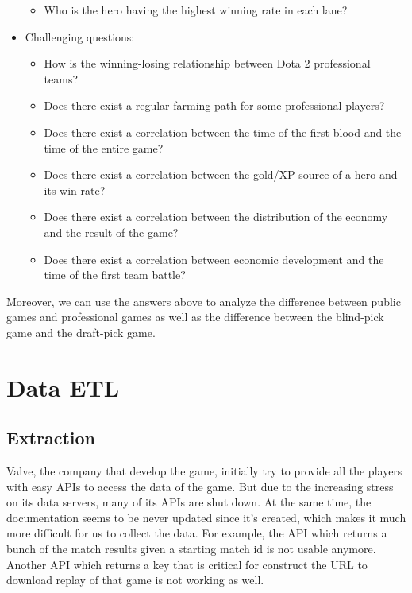 \documentclass{article}
\begin{document}
\begin{itemize}
\begin{itemize}
        \item Who is the hero having the highest winning rate in each lane?
    \end{itemize}
    \item Challenging questions:
    \begin{itemize}
        \item How is the winning-losing relationship between Dota 2 professional teams?
        \item Does there exist a regular farming path for some professional players?
        \item Does there exist a correlation between the time of the first blood and the time of the entire game?
        \item Does there exist a correlation between the gold/XP source of a hero and its win rate?
        \item Does there exist a correlation between the distribution of the economy and the result of the game?
        \item Does there exist a correlation between economic development and the time of the first team battle?
    \end{itemize}
\end{itemize}

Moreover, we can use the answers above to analyze the difference between public games and professional games as well as the difference between the blind-pick game and the draft-pick game.


\section{Data ETL}

\subsection{Extraction}

Valve, the company that develop the game, initially try to provide all the players with easy APIs to access the data of the game.
But due to the increasing stress on its data servers, many of its APIs are shut down.
At the same time, the documentation seems to be never updated since it's created, which makes it much more difficult for us to collect the data.
For example, the API which returns a bunch of the match results given a starting match id is not usable anymore.
Another API which returns a key that is critical for construct the URL to download replay of that game is not working as well.
\end{document}
